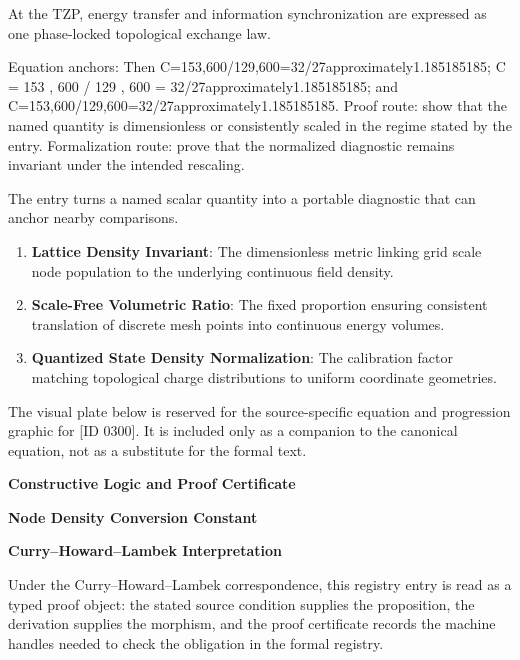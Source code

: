 At the TZP, energy transfer and information synchronization are expressed as one phase-locked topological exchange law.

Equation anchors: Then C=153,600/129,600=32/27approximately1.185185185; C = 153 , 600 / 129 , 600 = 32/27approximately1.185185185; and C=153,600/129,600=32/27approximately1.185185185. Proof route: show that the named quantity is dimensionless or consistently scaled in the regime stated by the entry. Formalization route: prove that the normalized diagnostic remains invariant under the intended rescaling.

The entry turns a named scalar quantity into a portable diagnostic that can anchor nearby comparisons.
\endgroup

\begin{enumerate}[leftmargin=1.6em,itemsep=6pt,topsep=4pt]
\item \textbf{Lattice Density Invariant}: The dimensionless metric linking grid scale node population to the underlying continuous field density.
\item \textbf{Scale-Free Volumetric Ratio}: The fixed proportion ensuring consistent translation of discrete mesh points into continuous energy volumes.
\item \textbf{Quantized State Density Normalization}: The calibration factor matching topological charge distributions to uniform coordinate geometries.
\end{enumerate}

\begingroup\footnotesize\sloppy
The visual plate below is reserved for the source-specific equation and progression graphic for [ID 0300]. It is included only as a companion to the canonical equation, not as a substitute for the formal text.
\par\endgroup
\ifTZPDarkEdition
{}
\fi

\clearpage
\begingroup\tzpsupportsetup
\noindent\textbf{\fontsize{10.8pt}{12.8pt}\selectfont [ID 0300] Constructive Logic and Proof Certificate}\par
\noindent\textbf{\fontsize{10pt}{12pt}\selectfont Node Density Conversion Constant}\par
\vspace{0.45em}
\begingroup
\footnotesize
\setlength{\parskip}{0.22em}
\setlength{\parindent}{0pt}
\noindent\textbf{Curry--Howard--Lambek Interpretation}\par
Under the Curry--Howard--Lambek correspondence, this registry entry is read as a typed proof
object: the stated source condition supplies the proposition, the derivation supplies the
morphism, and the proof certificate records the machine handles needed to check the obligation
in the formal registry.

